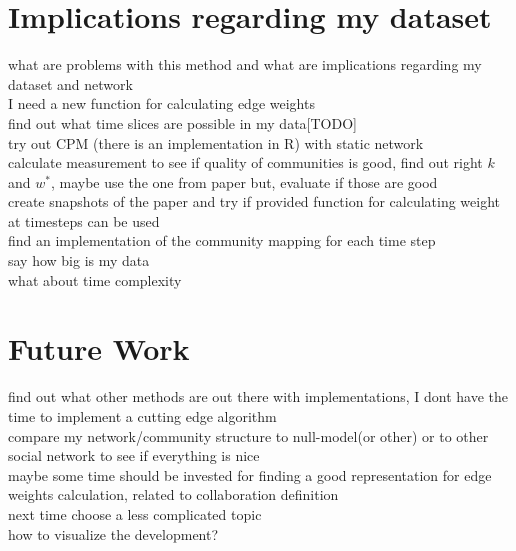 \documentclass[runningheads,a4paper]{llncs}
\begin{document}
\section{Implications regarding my dataset}
what are problems with this method and what are implications regarding my dataset and network\\
I need a new function for calculating edge weights\\
find out what time slices are possible in my data[TODO]\\
try out CPM (there is an implementation in R) with static network\\
calculate measurement to see if quality of communities is good, find out right $k$ and $w^*$, maybe use the one from paper but, evaluate if those are good\\
create snapshots of the paper and try if provided function for calculating weight at timesteps can be used\\
find an implementation of the community mapping for each time step\\

say how big is my data\\
what about time complexity\\

\section{Future Work}
find out what other methods are out there with implementations, I dont have the time to implement a cutting edge algorithm\\
compare my network/community structure to null-model(or other) or to other social network to see if everything is nice\\
maybe some time should be invested for finding a good representation for edge weights calculation, related to collaboration definition\\
next time choose a less complicated topic\\
how to visualize the development?




\end{document}
